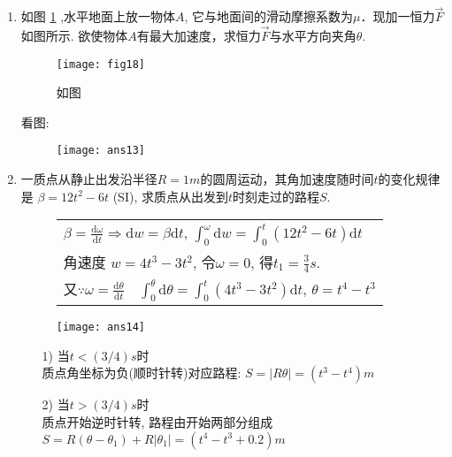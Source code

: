 \begin{enumerate}
     \item 如图 \ref{Fig:18} ,水平地面上放一物体$A$, 它与地面间的滑动摩擦系数为$\mu$．现加一恒力$\vec{F}$如图所示. 欲使物体$A$有最大加速度，求恒力$\vec{F}$与水平方向夹角$\theta$.
     \begin{figure}[H]
        \centering
        \texttt{[image: fig18]}
            \caption{如图}\label{Fig:18}
    \end{figure}
    \begin{solution}
        看图: 
        \begin{figure}[H]
            \centering
            \texttt{[image: ans13]}
        \end{figure}
    \end{solution}
    \item 一质点从静止出发沿半径$R=1m$的圆周运动，其角加速度随时间$t$的变化规律是 $\beta = 12t^2-6t$ (SI), 求质点从出发到$t$时刻走过的路程$S$.
    \begin{solution}

        \begin{figure}[ht]
            \begin{minipage}[ht]{0.7\linewidth}
                \begin{table}[H]
                    \begin{tabular}{l}
                       \qquad $\beta = \frac{\mathrm{d}\omega}{\mathrm{d}t}\Longrightarrow \mathrm{d}w=\beta \mathrm{d}t$, $\displaystyle{\int_0^\omega \mathrm{d}w = \int_0^t(12t^2-6t)\mathrm{d}t}$\\
                        
                       \qquad 角速度 $w = 4t^3-3t^2$, 令$\omega = 0$, 得$t_1=\frac{3}{4}s$. \\
                       \qquad 又$\because \omega = \frac{\mathrm{d}\theta}{\mathrm{d}t}$\ \ $\displaystyle{\int_0^{\theta}\mathrm{d}\theta = \displaystyle{\int_0^t(4t^3-3t^2)\mathrm{d}t}}$, 
                $\theta = t^4-t^3$
                    \end{tabular}
                \end{table}
            \end{minipage}
            \begin{minipage}[h]{0.25\linewidth}
                \texttt{[image: ans14]}
            \end{minipage}
        \end{figure}
        \begin{enumerate}
            \item[1)] 当$t<(3/4)s$时\\
            质点角坐标为负(顺时针转)对应路程: $S=|R\theta|=(t^3-t^4) m$
            \item[2)] 当$t>(3/4)s$时\\
            质点开始逆时针转, 路程由开始两部分组成 $S=R(\theta-\theta_1)+R|\theta_1|= (t^4-t^3+0.2) m$
        \end{enumerate}
    \end{solution}    
\end{enumerate}